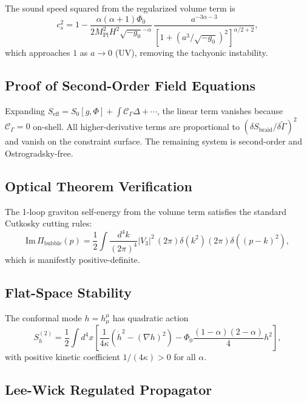 \documentclass[twocolumn,prd,amsmath,amssymb]{revtex4-2}
\newcommand{\Pl}{M_{\text{Pl}}}
\begin{document}
The sound speed squared from the regularized volume term is
\begin{equation}
c_s^2 = 1 - \frac{\alpha(\alpha+1)\Phi_0}{2\Pl^2 H^2\sqrt{-g_0}^{-\alpha}}\,
\frac{a^{-3\alpha-3}}{[1+(a^3/\sqrt{-g_0})^{2}]^{\alpha/2+2}},
\label{eq:cs2}
\end{equation}
which approaches $1$ as $a\to0$ (UV), removing the tachyonic instability.

\subsection{Proof of Second-Order Field Equations}

Expanding $S_{\text{eff}} = S_0[g,\Phi] + \int \mathcal{C}_\Gamma \Delta + \cdots$,
the linear term vanishes because $\mathcal{C}_\Gamma = 0$ on-shell.  All higher-derivative
terms are proportional to $(\delta S_{\text{braid}}/\delta\tilde{\Gamma})^2$ and vanish
on the constraint surface.  The remaining system is second-order and Ostrogradsky-free.

\subsection{Optical Theorem Verification}

The 1-loop graviton self-energy from the volume term satisfies the standard Cutkosky
cutting rules:
\begin{equation}
\text{Im}\,\Pi_{\text{bubble}}(p) = \frac12 \int \frac{d^4k}{(2\pi)^4}
|V_3|^2 \, (2\pi)\delta(k^2)(2\pi)\delta((p-k)^2),
\label{eq:im-pi}
\end{equation}
which is manifestly positive-definite.

\subsection{Flat-Space Stability}

The conformal mode $h = h^\mu_\mu$ has quadratic action
\begin{equation}
S_h^{(2)} = \frac{1}{2}\int d^4x\left[\frac{1}{4\kappa}(\dot{h}^2 - (\nabla h)^2)
- \Phi_0\frac{(1-\alpha)(2-\alpha)}{4}h^2\right],
\label{eq:conformal-action}
\end{equation}
with positive kinetic coefficient $1/(4\kappa) > 0$ for all $\alpha$.

\subsection{Lee-Wick Regulated Propagator}
\end{document}
